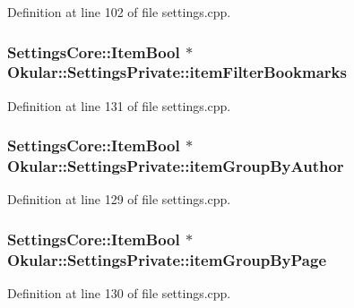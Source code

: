 Definition at line 102 of file settings.\+cpp.

\hypertarget{classOkular_1_1SettingsPrivate_a75423605407f669f478df13cf97265a0}{
\subsubsection[{item\+Filter\+Bookmarks}]{\setlength{\rightskip}{0pt plus 5cm}Settings\+Core\+::\+Item\+Bool $\ast$ Okular\+::\+Settings\+Private\+::item\+Filter\+Bookmarks}}\label{classOkular_1_1SettingsPrivate_a75423605407f669f478df13cf97265a0}


Definition at line 131 of file settings.\+cpp.

\hypertarget{classOkular_1_1SettingsPrivate_a57a785999d9858210969231df3bcaa09}{
\subsubsection[{item\+Group\+By\+Author}]{\setlength{\rightskip}{0pt plus 5cm}Settings\+Core\+::\+Item\+Bool $\ast$ Okular\+::\+Settings\+Private\+::item\+Group\+By\+Author}}\label{classOkular_1_1SettingsPrivate_a57a785999d9858210969231df3bcaa09}


Definition at line 129 of file settings.\+cpp.

\hypertarget{classOkular_1_1SettingsPrivate_adcb32a4d1392e9650541dfbbf7b22dff}{
\subsubsection[{item\+Group\+By\+Page}]{\setlength{\rightskip}{0pt plus 5cm}Settings\+Core\+::\+Item\+Bool $\ast$ Okular\+::\+Settings\+Private\+::item\+Group\+By\+Page}}\label{classOkular_1_1SettingsPrivate_adcb32a4d1392e9650541dfbbf7b22dff}


Definition at line 130 of file settings.\+cpp.

